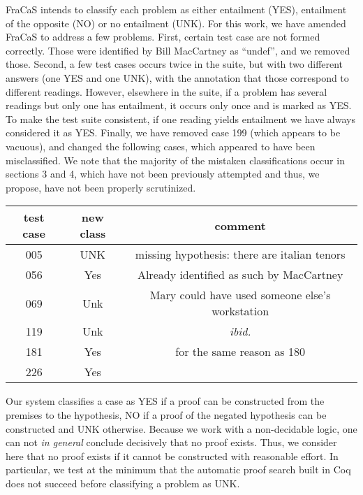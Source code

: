 \documentclass{article}
\begin{document}
FraCaS intends to classify each problem as either entailment (YES),
entailment of the opposite (NO) or no entailment (UNK).  For this
work, we have amended FraCaS to address a few problems. First, certain
test case are not formed correctly. Those were identified by Bill
MacCartney as ``undef'', and we removed those. Second, a few test
cases occurs twice in the suite, but with two different answers (one
YES and one UNK), with the annotation that those correspond to
different readings. However, elsewhere in the suite, if a problem has
several readings but only one has entailment, it occurs only once and
is marked as YES. To make the test suite consistent, if one reading
yields entailment we have always considered it as YES. Finally, we
have removed case 199 (which appears to be vacuous), and changed the
following cases, which appeared to have been misclassified. We note
that the majority of the mistaken classifications occur in sections 3
and 4, which have not been previously attempted and thus, we propose,
have not been properly scrutinized.

\begin{center}
\begin{tabular}{ccc}
 test case & new class & comment \\ \hline
    005 & UNK & missing hypothesis: there are italian tenors \\
   056 &  Yes & Already identified as such by MacCartney \\
  069 & Unk & Mary could have used someone else's workstation \\
  119 & Unk & \textit{ibid.} \\
  181 & Yes & for the same reason as 180 \\
  226 & Yes &
\end{tabular}
\end{center}

Our system classifies a case as YES if a proof can be constructed from
the premises to the hypothesis, NO if a proof of the negated
hypothesis can be constructed and UNK otherwise. Because we work with
a non-decidable logic, one can not \emph{in general} conclude
decisively that no proof exists. Thus, we consider here that no proof
exists if it cannot be constructed with reasonable effort. In
particular, we test at the minimum that the automatic proof search
built in Coq does not succeed before classifying a problem as UNK.
\end{document}
